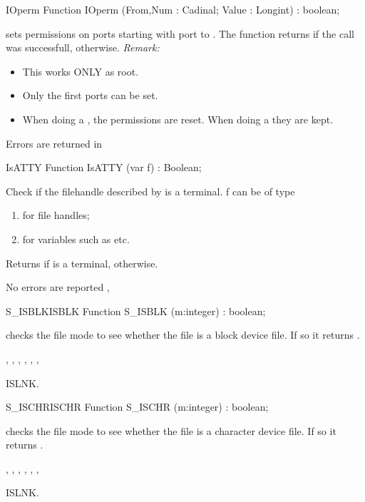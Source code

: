 \begin{function}{IOperm}
\Declaration
Function IOperm (From,Num : Cadinal; Value : Longint) : boolean;

\Description
{}
  sets permissions on  ports starting with port  to 
  . The function returns  if the call was successfull,
   otherwise.
{\em Remark:}
\begin{itemize}
\item This works ONLY as root.
\item Only the first  ports can be set.
\item When doing a , the permissions are reset. When doing a
 they are kept.
\end{itemize}

\Errors
Errors are returned in 
\SeeAlso
{}
\end{function}
\begin{function}{IsATTY}
\Declaration
Function IsATTY (var f) : Boolean;

\Description

Check if the filehandle described by  is a terminal.
f can be of type
\begin{enumerate}
\item {} for file handles;
\item {} for  variables such as  etc.
\end{enumerate}
Returns  if  is a terminal,  otherwise.

\Errors
No errors are reported
\SeeAlso
{},
\end{function}
\begin{functionl}{S\_ISBLK}{ISBLK}
\Declaration
Function S\_ISBLK (m:integer) : boolean;

\Description
  checks the file mode  to see whether the file is a
block device file. If so it returns .

\Errors
{},
 , 
 ,
 ,
 ,
 ,

\SeeAlso
ISLNK.
\end{functionl}
\begin{functionl}{S\_ISCHR}{ISCHR}
\Declaration
Function S\_ISCHR (m:integer) : boolean;

\Description
  checks the file mode  to see whether the file is a
character device file. If so it returns .

\Errors
{},
 , 
 ,
 ,
 ,
 ,

\SeeAlso
ISLNK.
\end{functionl}
